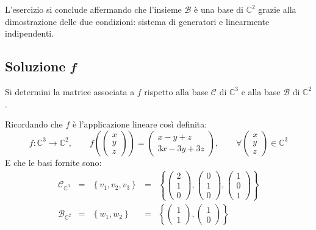 \documentclass[a4paper]{article}
\begin{document}
	\noindent
	L'esercizio si conclude affermando che l'insieme $\mathscr{B}$ è una base di $\mathbb{C}^{2}$ grazie alla dimostrazione delle due condizioni: sistema di generatori e linearmente indipendenti.\newpage
	
	\subsection{Soluzione \emph{f}}
	
	Si determini la matrice associata a $f$ rispetto alla base $\mathscr{C}$ di $\mathbb{C}^{3}$ e alla base $\mathscr{B}$ di $\mathbb{C}^{2}$.\newline
	
	\noindent
	Ricordando che $f$ è l'applicazione lineare così definita:
	\begin{equation*}
		f: \mathbb{C}^{3} \longrightarrow \mathbb{C}^{2}, \hspace{2em}
		f \left(
		\begin{pmatrix}
			x \\ y \\ z
		\end{pmatrix}
		\right) = \begin{pmatrix}
			x-y+z \\
			3x-3y+3z
		\end{pmatrix}, \hspace{2em}
		\forall \begin{pmatrix}
			x \\ y \\ z
		\end{pmatrix} \in \mathbb{C}^{3}
	\end{equation*}
	E che le basi fornite sono:
	\begin{equation*}
		\begin{array}{lllll}
			\mathscr{C}_{\mathbb{C}^{3}} &=& \left\{v_{1}, v_{2}, v_{3}\right\} &=& \left\{\begin{pmatrix}
				2 \\ 1 \\ 0
			\end{pmatrix}, \begin{pmatrix}
				0 \\ 1 \\ 0
			\end{pmatrix}, \begin{pmatrix}
				1 \\ 0 \\ 1
			\end{pmatrix}\right\} \\ [1.8em]
			\mathscr{B}_{\mathbb{C}^{2}} &=& \left\{w_{1}, w_{2}\right\} &=& \left\{\begin{pmatrix}
				1 \\ 1
			\end{pmatrix}, \begin{pmatrix}
				1 \\ 0
			\end{pmatrix}\right\}
		\end{array}
	\end{equation*}
\end{document}
